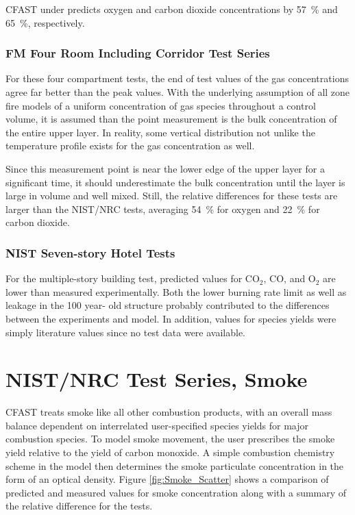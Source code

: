 CFAST under predicts oxygen and carbon dioxide concentrations by 57~\% and 65~\%, respectively.

\subsubsection{FM Four Room Including Corridor Test Series}

For these four compartment tests, the end of test values of the gas concentrations agree far better than the peak values. With the underlying assumption of all zone fire models of a uniform concentration of gas species throughout a control volume,  it is assumed than the point measurement is the bulk concentration of the entire upper layer.  In reality, some vertical distribution not unlike the temperature profile exists for the gas concentration as well. 

Since this measurement point is near the lower edge of the upper layer for a significant time, it 
should underestimate the bulk concentration until the layer is large in volume and well mixed.  Still, the relative differences for these tests are larger than the NIST/NRC tests, averaging 54~\% for oxygen and 22~\% for carbon dioxide.

\subsubsection{NIST Seven-story Hotel Tests}

For the multiple-story building test, predicted values for CO$_2$, CO, and O$_2$ are lower than 
measured experimentally.  Both the lower burning rate limit as well as leakage in the 100 year- 
old structure probably contributed to the differences between the experiments and model.  In 
addition, values for species yields were simply literature values since no test data were available.

\section{NIST/NRC Test Series, Smoke}

CFAST treats smoke like all other combustion products, with an overall mass balance dependent on interrelated user-specified species yields for major combustion species.  To model smoke movement, the user prescribes the smoke yield relative to the yield of carbon monoxide.  A simple combustion chemistry scheme in the model then determines the smoke particulate concentration in the form of an optical density.  Figure \ref{fig:Smoke_Scatter} shows a comparison of predicted and measured values for smoke concentration along with a summary of the relative difference for the tests.

